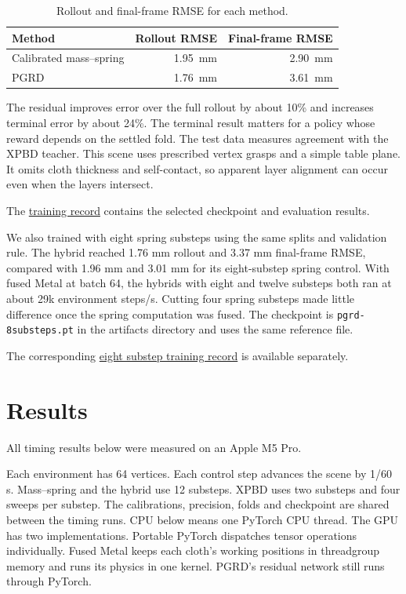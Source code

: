 \documentclass[sigconf]{acmart}
\begin{document}
\begin{table}[!htbp]
  \caption{Rollout and final-frame RMSE for each method.}
  \label{tab:rmse}
  \small
  \begin{tabular}{@{}lrr@{}}
    \toprule
    Method & Rollout RMSE & Final-frame RMSE \\
    \midrule
    Calibrated mass--spring & 1.95~mm & 2.90~mm \\
    PGRD & 1.76~mm & 3.61~mm \\
    \bottomrule
  \end{tabular}
\end{table}

The residual improves error over the full rollout by about 10\% and increases terminal error by about 24\%. The terminal result matters for a policy whose reward depends on the settled fold. The test data measures agreement with the XPBD teacher. This scene uses prescribed vertex grasps and a simple table plane. It omits cloth thickness and self-contact, so apparent layer alignment can occur even when the layers intersect. 

The \href{https://github.com/charlesxu0124/284A-final-project/blob/main/artifacts/training.json}{training record} contains the selected checkpoint and evaluation results.

We also trained with eight spring substeps using the same splits and validation rule. The hybrid reached 1.76 mm rollout and 3.37 mm final-frame RMSE, compared with 1.96 mm and 3.01 mm for its eight-substep spring control. With fused Metal at batch 64, the hybrids with eight and twelve substeps both ran at about 29k environment steps/s. Cutting four spring substeps made little difference once the spring computation was fused. The checkpoint is \texttt{pgrd-8substeps.pt} in the artifacts directory and uses the same reference file. 

The corresponding \href{https://github.com/charlesxu0124/284A-final-project/blob/main/artifacts/training-8substeps.json}{eight substep training record} is available separately.

\section{Results}

All timing results below were measured on an Apple M5 Pro.

Each environment has 64 vertices. Each control step advances the scene by 1/60 s. Mass--spring and the hybrid use 12 substeps. XPBD uses two substeps and four sweeps per substep. The calibrations, precision, folds and checkpoint are shared between the timing runs. CPU below means one PyTorch CPU thread. The GPU has two implementations. Portable PyTorch dispatches tensor operations individually. Fused Metal keeps each cloth's working positions in threadgroup memory and runs its physics in one kernel. PGRD's residual network still runs through PyTorch.
\end{document}
